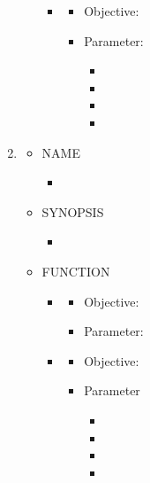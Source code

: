 \documentclass{swfcthesis}
\begin{document}
\begin{enumerate}
\begin{itemize}
\begin{itemize}
    \item \texttt{}
      \begin{itemize}
      \item Objective:
      \item Parameter:
        \begin{itemize}
        \item
        \item
        \item
        \item
        \end{itemize}
      \end{itemize}
      
    \end{itemize}
    
  \end{itemize}


\item
  \begin{itemize}
  \item NAME
    \begin{itemize}
    \item \texttt{}
    \end{itemize}
    
  \item SYNOPSIS
    \begin{itemize}
    \item \texttt{}
    \end{itemize}
    
  \item FUNCTION
    \begin{itemize}
    \item \texttt{}
      \begin{itemize}
      \item Objective: 
        \texttt{}
      \item Parameter: 
      \end{itemize}
      
    \item \texttt{}
      \begin{itemize}
      \item Objective:
      \item Parameter
        \begin{itemize}
        \item \texttt{}
        \item
        \item
        \item
        \end{itemize}
      \end{itemize}


\end{itemize}
\end{itemize}
\end{enumerate}
\end{document}
